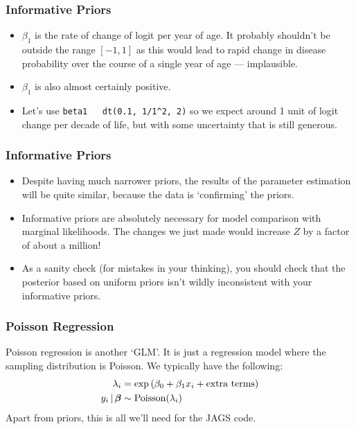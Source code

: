 \documentclass{beamer}
\newcommand{\given}{\,|\,}
\begin{document}
\begin{frame}[fragile]
\frametitle{Informative Priors}

\begin{itemize}
\item $\beta_1$ is the rate of change of logit per year of age. It
probably shouldn't be outside the range $[-1, 1]$
as this would lead to rapid change in disease probability over the course
of a single year of age --- implausible.\pause
\item $\beta_1$ is also almost certainly positive.\pause
\item Let's use \texttt{beta1 ~ dt(0.1, 1/1^2, 2)} so we expect
around 1 unit of logit change per decade of life, but with some uncertainty
that is still generous.
\end{itemize}

\end{frame}

\begin{frame}
\frametitle{Informative Priors}
\begin{itemize}
\item Despite having much narrower priors, the results of the parameter estimation
will be quite similar, because the data is `confirming' the priors.\pause
\item Informative priors are absolutely necessary for model comparison with
marginal likelihoods. The changes we just made would increase $Z$ by a factor
of about a million!\pause
\item As a sanity check (for mistakes in your thinking), you should check
that the posterior based on uniform priors isn't wildly inconsistent with
your informative priors.
\end{itemize}

\end{frame}


\begin{frame}
\frametitle{Poisson Regression}
Poisson regression is another `GLM'. It is just a regression model where
the sampling distribution is Poisson. We typically have the following:
\begin{align}
\lambda_i &= \exp\left(\beta_0 + \beta_1 x_i + \textnormal{extra terms}\right) \\
y_i \given \boldsymbol{\beta} &\sim \textnormal{Poisson}(\lambda_i)
\end{align}
Apart from priors, this is all we'll need for the JAGS code.

\end{frame}
\end{document}

